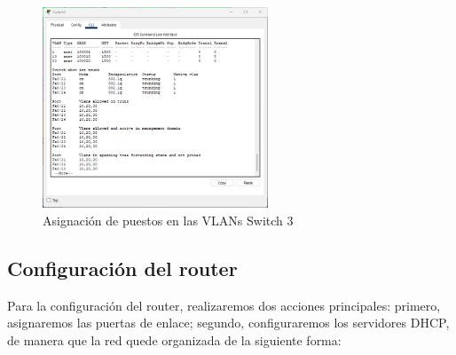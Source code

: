     \begin{figure}[H]
        \centering
        \includegraphics[width=0.6\textwidth]{img/trunsw4.png}
        \caption{Asignación de puestos en las VLANs Switch 3}
        \label{fig:swtru4}
    \end{figure}
    \subsection*{Configuración del router}
    Para la configuración del router, realizaremos dos acciones principales: primero, asignaremos las puertas de enlace; segundo, configuraremos los servidores DHCP, de manera que la red quede organizada de la siguiente forma:
    
